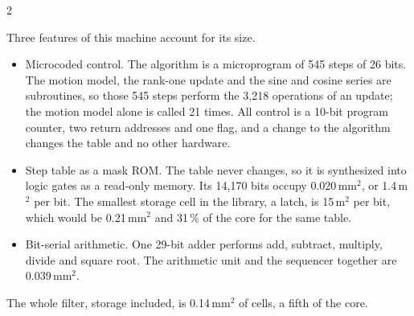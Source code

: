 \documentclass[10pt,letterpaper]{article}
\begin{document}
\begin{multicols}{2}

  Three features of this machine account for its size.
  \begin{itemize}
    \item Microcoded control.
      The algorithm is a microprogram of 545 steps of 26 bits.
      The motion model, the rank-one update and the sine and cosine series are subroutines, so those 545 steps perform the 3,218 operations of an update; the motion model alone is called 21 times.
      All control is a 10-bit program counter, two return addresses and one flag, and a change to the algorithm changes the table and no other hardware.
    \item Step table as a mask ROM.
      The table never changes, so it is synthesized into logic gates as a read-only memory.
      Its 14,170 bits occupy 0.020\,mm$^2$, or 1.4\,\textmu m$^2$ per bit.
      The smallest storage cell in the library, a latch, is 15\,\textmu m$^2$ per bit, which would be 0.21\,mm$^2$ and 31\,\% of the core for the same table.
    \item Bit-serial arithmetic.
      One 29-bit adder performs add, subtract, multiply, divide and square root.
      The arithmetic unit and the sequencer together are 0.039\,mm$^2$.
  \end{itemize}
  The whole filter, storage included, is 0.14\,mm$^2$ of cells, a fifth of the core.


\end{multicols}
\end{document}

